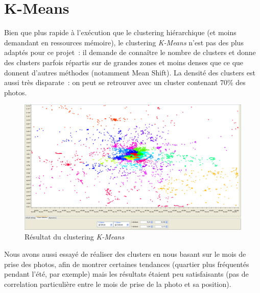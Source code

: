 \section{K-Means}
    Bien que plus rapide à l’exécution que le clustering hiérarchique (et moins demandant en ressources mémoire),
    le clustering \textit{K-Means} n'est pas des plus adaptés pour ce projet~: il demande de connaître le nombre de clusters et
    donne des clusters parfois répartis sur de grandes zones et moins denses que ce que donnent d'autres méthodes (notamment Mean Shift). La densité des clusters est aussi très disparate~: on peut se retrouver avec un cluster contenant 70\% des photos.

    \begin{figure}[H]
        \centering
        \includegraphics[scale=0.25]{../screenshots/kmeans_geographic.png}
        \caption{Résultat du clustering \textit{K-Means}}
        \label{diagram:kmeans_geographic}
    \end{figure}

    Nous avons aussi essayé de réaliser des clusters en nous basant sur le mois de prise des photos, afin de montrer certaines tendances (quartier plus fréquentés pendant l'été, par exemple) mais les résultats étaient peu satisfaisants (pas de correlation particulière entre le mois de prise de la photo et sa position).

